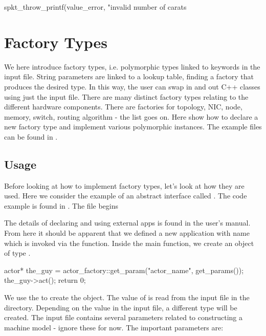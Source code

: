 \begin{CppCode}
spkt_throw_printf(value_error, "invalid number of carats %
\end{CppCode}
 

\section{Factory Types}\label{sec:factory}
We here introduce factory types, i.e. polymorphic types linked to keywords in the input file.
String parameters are linked to a lookup table, finding a factory that produces the desired type.
In this way, the user can swap in and out C++ classes using just the input file.
There are many distinct factory types relating to the different hardware components.
There are factories for topology, NIC, node, memory, switch, routing algorithm - the list goes on.
Here show how to declare a new factory type and implement various polymorphic instances.
The example files can be found in .

\subsection{Usage}\label{subsec:usage}
Before looking at how to implement factory types, let's look at how they are used.
Here we consider the example of an abstract interface called .
The code example is found in . The file begins

\begin{CppCode}
#include <sstmac/skeleton.h>
#include "actor.h"

namespace sstmac {
    namespace tutorial {

#define sstmac_app_name rob_reiner

int
main(int argc, char **argv)
{
\end{CppCode}
The details of declaring and using external apps is found in the user's manual.
From here it should be apparent that we defined a new application with name 
which is invoked via the  function.
Inside the main function, we create an object of type .

\begin{CppCode}
actor* the_guy = actor_factory::get_param("actor_name", get_params());
the_guy->act();
return 0;
\end{CppCode}
We use the  to create the object.
The value of  is read from the input file  in the directory.
Depending on the value in the input file, a different type will be created.
The input file contains several parameters related to constructing a machine model - ignore these for now.
The important parameters are:

